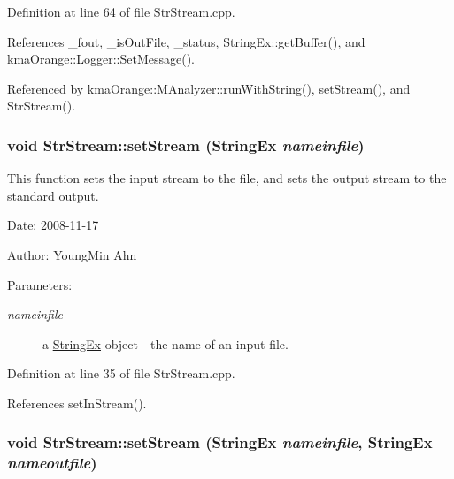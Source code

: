 Definition at line 64 of file StrStream.cpp.

References \_\-fout, \_\-isOutFile, \_\-status, StringEx::getBuffer(), and kmaOrange::Logger::SetMessage().

Referenced by kmaOrange::MAnalyzer::runWithString(), setStream(), and StrStream().\hypertarget{classkmaOrange_1_1StrStream_d2fc861331ed65e13c09eaf55b4456d8}{
\subsubsection[{setStream}]{\setlength{\rightskip}{0pt plus 5cm}void StrStream::setStream ({\bf StringEx} {\em nameinfile})}}
\label{classkmaOrange_1_1StrStream_d2fc861331ed65e13c09eaf55b4456d8}


This function sets the input stream to the file, and sets the output stream to the standard output. 

\begin{Desc}
\item[Date:]2008-11-17 \end{Desc}
\begin{Desc}
\item[Author:]YoungMin Ahn \end{Desc}
\begin{Desc}
\item[Parameters:]
\begin{description}
\item[{\em nameinfile}]a \hyperlink{classStringEx}{StringEx} object - the name of an input file. \end{description}
\end{Desc}


Definition at line 35 of file StrStream.cpp.

References setInStream().\hypertarget{classkmaOrange_1_1StrStream_6a1562a9ccdd5ca9c935a904aa27e250}{
\subsubsection[{setStream}]{\setlength{\rightskip}{0pt plus 5cm}void StrStream::setStream ({\bf StringEx} {\em nameinfile}, \/  {\bf StringEx} {\em nameoutfile})}}
\label{classkmaOrange_1_1StrStream_6a1562a9ccdd5ca9c935a904aa27e250}


